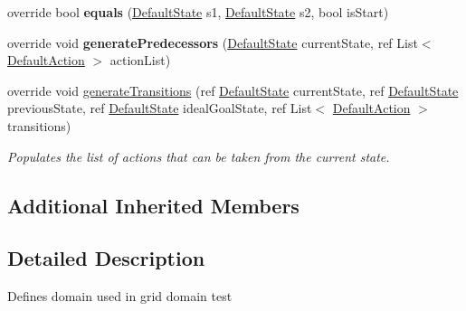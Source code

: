 \begin{DoxyCompactItemize}
\item 
\hypertarget{class_a_r_astar_domain_a3da7327f8e5bf0594ba9ddb5c183475c}{override bool {\bfseries equals} (\hyperlink{class_default_state}{Default\-State} s1, \hyperlink{class_default_state}{Default\-State} s2, bool is\-Start)}\label{class_a_r_astar_domain_a3da7327f8e5bf0594ba9ddb5c183475c}

\item 
\hypertarget{class_a_r_astar_domain_a9d17ca7a84828a5af57ae2d8df034354}{override void {\bfseries generate\-Predecessors} (\hyperlink{class_default_state}{Default\-State} current\-State, ref List$<$ \hyperlink{class_default_action}{Default\-Action} $>$ action\-List)}\label{class_a_r_astar_domain_a9d17ca7a84828a5af57ae2d8df034354}

\item 
override void \hyperlink{class_a_r_astar_domain_a16890b0a0fea5a007b3ad3264c39dd91}{generate\-Transitions} (ref \hyperlink{class_default_state}{Default\-State} current\-State, ref \hyperlink{class_default_state}{Default\-State} previous\-State, ref \hyperlink{class_default_state}{Default\-State} ideal\-Goal\-State, ref List$<$ \hyperlink{class_default_action}{Default\-Action} $>$ transitions)
\begin{DoxyCompactList}\small\item\em Populates the list of actions that can be taken from the current state. \end{DoxyCompactList}\end{DoxyCompactItemize}
\subsection*{Additional Inherited Members}


\subsection{Detailed Description}
Defines domain used in grid domain test 

